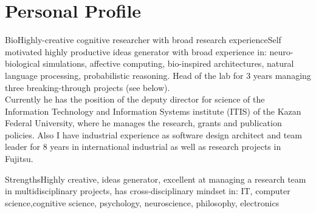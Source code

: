\documentclass{moderncv}
\begin{document}

\makecvtitle

 
\section{Personal Profile}

\cventry
    {Bio}{Highly-creative cognitive researcher with broad research experience}{}{}{}{Self motivated highly productive ideas generator with broad experience in: neuro-biological simulations, affective computing, bio-inspired architectures, natural language processing, probabilistic reasoning. Head of the lab for 3 years managing three breaking-through projects (see below).\\
      Currently he has the position of the deputy director for science of the Information Technology and Information Systems institute (ITIS) of the Kazan Federal University, where he manages the research, grants and publication policies. Also I have industrial experience as software design architect and team leader for 8 years in international industrial as well as research projects in Fujitsu.}

\cvitem
{Strengths}{Highly creative, ideas generator, excellent at managing a research team in multidisciplinary projects, has cross-disciplinary mindset in: IT, computer science,cognitive science, psychology, neuroscience, philosophy, electronics}
\end{document}
